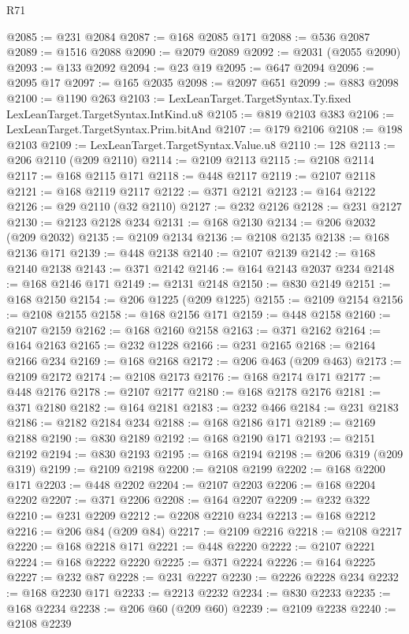 \begin{lexlean}{R71}
\begin{coremodule}
@2085 := @231 @2084
@2087 := @168 @2085 @171
@2088 := @536 @2087
@2089 := @1516 @2088
@2090 := @2079 @2089
@2092 := @2031 (@2055 @2090)
@2093 := @133 @2092
@2094 := @23 @19
@2095 := @647 @2094
@2096 := @2095 @17
@2097 := @165 @2035
@2098 := @2097 @651
@2099 := @883 @2098
@2100 := @1190 @263
@2103 := LexLeanTarget.TargetSyntax.Ty.fixed LexLeanTarget.TargetSyntax.IntKind.u8
@2105 := @819 @2103 @383
@2106 := LexLeanTarget.TargetSyntax.Prim.bitAnd
@2107 := @179 @2106
@2108 := @198 @2103
@2109 := LexLeanTarget.TargetSyntax.Value.u8
@2110 := 128
@2113 := @206 @2110 (@209 @2110)
@2114 := @2109 @2113
@2115 := @2108 @2114
@2117 := @168 @2115 @171
@2118 := @448 @2117
@2119 := @2107 @2118
@2121 := @168 @2119 @2117
@2122 := @371 @2121
@2123 := @164 @2122
@2126 := @29 @2110 (@32 @2110)
@2127 := @232 @2126
@2128 := @231 @2127
@2130 := @2123 @2128 @234
@2131 := @168 @2130
@2134 := @206 @2032 (@209 @2032)
@2135 := @2109 @2134
@2136 := @2108 @2135
@2138 := @168 @2136 @171
@2139 := @448 @2138
@2140 := @2107 @2139
@2142 := @168 @2140 @2138
@2143 := @371 @2142
@2146 := @164 @2143 @2037 @234
@2148 := @168 @2146 @171
@2149 := @2131 @2148
@2150 := @830 @2149
@2151 := @168 @2150
@2154 := @206 @1225 (@209 @1225)
@2155 := @2109 @2154
@2156 := @2108 @2155
@2158 := @168 @2156 @171
@2159 := @448 @2158
@2160 := @2107 @2159
@2162 := @168 @2160 @2158
@2163 := @371 @2162
@2164 := @164 @2163
@2165 := @232 @1228
@2166 := @231 @2165
@2168 := @2164 @2166 @234
@2169 := @168 @2168
@2172 := @206 @463 (@209 @463)
@2173 := @2109 @2172
@2174 := @2108 @2173
@2176 := @168 @2174 @171
@2177 := @448 @2176
@2178 := @2107 @2177
@2180 := @168 @2178 @2176
@2181 := @371 @2180
@2182 := @164 @2181
@2183 := @232 @466
@2184 := @231 @2183
@2186 := @2182 @2184 @234
@2188 := @168 @2186 @171
@2189 := @2169 @2188
@2190 := @830 @2189
@2192 := @168 @2190 @171
@2193 := @2151 @2192
@2194 := @830 @2193
@2195 := @168 @2194
@2198 := @206 @319 (@209 @319)
@2199 := @2109 @2198
@2200 := @2108 @2199
@2202 := @168 @2200 @171
@2203 := @448 @2202
@2204 := @2107 @2203
@2206 := @168 @2204 @2202
@2207 := @371 @2206
@2208 := @164 @2207
@2209 := @232 @322
@2210 := @231 @2209
@2212 := @2208 @2210 @234
@2213 := @168 @2212
@2216 := @206 @84 (@209 @84)
@2217 := @2109 @2216
@2218 := @2108 @2217
@2220 := @168 @2218 @171
@2221 := @448 @2220
@2222 := @2107 @2221
@2224 := @168 @2222 @2220
@2225 := @371 @2224
@2226 := @164 @2225
@2227 := @232 @87
@2228 := @231 @2227
@2230 := @2226 @2228 @234
@2232 := @168 @2230 @171
@2233 := @2213 @2232
@2234 := @830 @2233
@2235 := @168 @2234
@2238 := @206 @60 (@209 @60)
@2239 := @2109 @2238
@2240 := @2108 @2239

\end{coremodule}
\end{lexlean}

